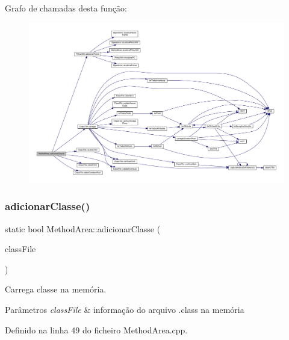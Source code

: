 Grafo de chamadas desta função\+:
\nopagebreak
\begin{figure}[H]
\begin{center}
\leavevmode
\includegraphics[width=350pt]{classMethodArea_a30233142aefa26c17a3a222582cb56c1_cgraph}
\end{center}
\end{figure}
\mbox{\label{classMethodArea_ac2a5ab0e6b36c9af7062f145218b4cf0}} 
\subsubsection{\texorpdfstring{adicionar\+Classe()}{adicionarClasse()}\hspace{0.1cm}{\footnotesize\ttfamily [2/2]}}
{\footnotesize\ttfamily static bool Method\+Area\+::adicionar\+Classe (\begin{DoxyParamCaption}\item[{\hyperlink{classClassFile}{Class\+File} $\ast$}]{class\+File }\end{DoxyParamCaption})\hspace{0.3cm}{\ttfamily [static]}}



Carrega classe na memória. 


\begin{DoxyParams}{Parâmetros}
{\em class\+File} & informação do arquivo .class na memória \\
\hline
\end{DoxyParams}


Definido na linha 49 do ficheiro Method\+Area.\+cpp.



